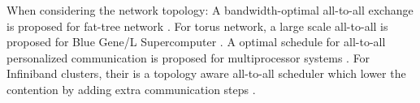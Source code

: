 When considering the network topology: A bandwidth-optimal all-to-all exchange is proposed for fat-tree network \cite{prisacari2013bandwidth}. 
For torus network, a large scale all-to-all is proposed for Blue Gene/L Supercomputer \cite{kumar2008optimization}.  
A optimal schedule for all-to-all personalized communication is proposed for multiprocessor systems \cite{saha2019optimal}. 
For Infiniband clusters, their is a topology aware all-to-all scheduler which lower the contention by adding extra communication steps \cite{subramoni2014designing}.

